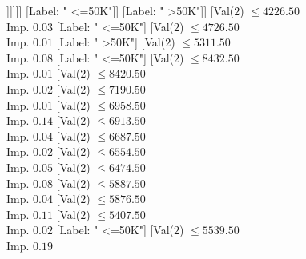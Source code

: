 \documentclass[margin=10pt]{standalone}
\begin{document}
\begin{forest}
																																									[Val($2$) $ \leq 3203.50$ \\ Imp. $0.09$
																																										[Label: " >50K"]
																																										[Val($2$) $ \leq 3232.50$ \\ Imp. $0.20$
																																											[Label: " <=50K"]
																																											[Label: " >50K"]]]]]]
																																						[Label: " <=50K"]]
																																					[Label: " >50K"]]
																																				[Val($2$) $ \leq 4226.50$ \\ Imp. $0.03$
																																					[Label: " <=50K"]
																																					[Val($2$) $ \leq 4726.50$ \\ Imp. $0.01$
																																						[Label: " >50K"]
																																						[Val($2$) $ \leq 5311.50$ \\ Imp. $0.08$
																																							[Label: " <=50K"]
																																							[Val($2$) $ \leq 8432.50$ \\ Imp. $0.01$
																																								[Val($2$) $ \leq 8420.50$ \\ Imp. $0.02$
																																									[Val($2$) $ \leq 7190.50$ \\ Imp. $0.01$
																																										[Val($2$) $ \leq 6958.50$ \\ Imp. $0.14$
																																											[Val($2$) $ \leq 6913.50$ \\ Imp. $0.04$
																																												[Val($2$) $ \leq 6687.50$ \\ Imp. $0.02$
																																													[Val($2$) $ \leq 6554.50$ \\ Imp. $0.05$
																																														[Val($2$) $ \leq 6474.50$ \\ Imp. $0.08$
																																															[Val($2$) $ \leq 5887.50$ \\ Imp. $0.04$
																																																[Val($2$) $ \leq 5876.50$ \\ Imp. $0.11$
																																																	[Val($2$) $ \leq 5407.50$ \\ Imp. $0.02$
																																																		[Label: " <=50K"]
																																																		[Val($2$) $ \leq 5539.50$ \\ Imp. $0.19$

\end{forest}
\end{document}
